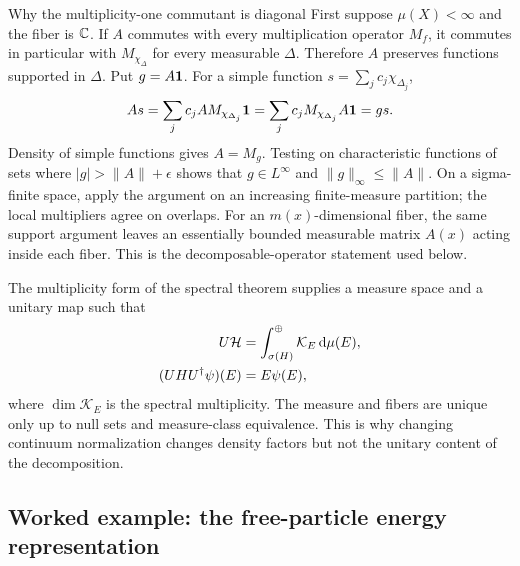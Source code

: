 \begin{derivationbox}{Why the multiplicity-one commutant is diagonal}
First suppose $\mu(X)<\infty$ and the fiber is $\mathbb{C}$.  If $A$ commutes
with every multiplication operator $M_f$, it commutes in particular with
$M_{\chi_\Delta}$ for every measurable $\Delta$.  Therefore $A$ preserves
functions supported in $\Delta$.  Put $g=A\mathbf{1}$.  For a simple function
$s=\sum_jc_j\chi_{\Delta_j}$,
\begin{equation}
  As=\sum_jc_jA M_{\chi_{\Delta_j}}\mathbf{1}
  =\sum_jc_jM_{\chi_{\Delta_j}}A\mathbf{1}=gs.
  \label{eq:multiplicity-one-simple-proof}
\end{equation}
Density of simple functions gives $A=M_g$.  Testing on characteristic
functions of sets where $|g|>\|A\|+\epsilon$ shows that
$g\in L^\infty$ and $\|g\|_\infty\leq\|A\|$.  On a sigma-finite space, apply
the argument on an increasing finite-measure partition; the local multipliers
agree on overlaps.  For an $m(x)$-dimensional fiber, the same support argument
leaves an essentially bounded measurable matrix $A(x)$ acting inside each
fiber.  This is the decomposable-operator statement used below.
\end{derivationbox}

The multiplicity form of the spectral theorem supplies a measure space and a
unitary map such that
\begin{align}
  U\mathcal{H}
  &=\int_{\sigma(H)}^\oplus\mathcal K_E\,\mathrm{d}\mu(E),
  \label{eq:spectral-direct-integral}\\
  (UHU^\dagger\psi)(E)
  &=E\psi(E),
  \label{eq:H-multiplication-direct-integral}
\end{align}
where $\dim\mathcal K_E$ is the spectral multiplicity.  The measure and
fibers are unique only up to null sets and measure-class equivalence.  This is
why changing continuum normalization changes density factors but not the
unitary content of the decomposition.

\subsection{Worked example: the free-particle energy representation}
\label{subsec:free-direct-integral}

